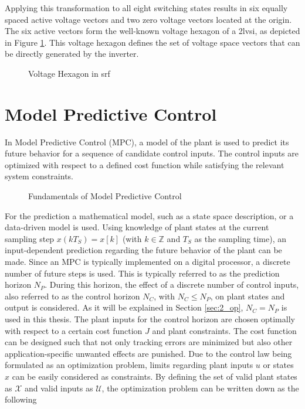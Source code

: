 Applying this transformation to all eight switching states results in six equally spaced active voltage vectors and two zero voltage vectors located at the origin. The six active vectors form the well-known voltage hexagon of a \acrshort{2lvsi}, as depicted in Figure \ref{fig:0_SRF_hexagon}. This voltage hexagon defines the set of voltage space vectors that can be directly generated by the inverter.
\begin{figure}[H]
	\centering
	
	\caption{Voltage Hexagon in \acrshort{srf}}
	\label{fig:0_SRF_hexagon}
\end{figure}

\section{Model Predictive Control} \label{sec:0_mpc}
In Model Predictive Control (MPC), a model of the plant is used to predict its future behavior for a sequence of candidate control inputs. The control inputs are optimized with respect to a defined cost function while satisfying the relevant system constraints. \\
\begin{figure}[h]
    \centering
    
    \caption{Fundamentals of Model Predictive Control}
    \label{fig:0_mpc_scheme}
\end{figure}
For the prediction a mathematical model, such as a state space description, or a data-driven model is used. Using knowledge of plant states at the current sampling step $x(kT_S) = x[k]$ (with $k\in\mathbb{Z}$ and $T_S$ as the sampling time), an input-dependent prediction regarding the future behavior of the plant can be made. Since an MPC is typically implemented on a digital processor, a discrete number of future steps is used. This is typically referred to as the prediction horizon $N_P$. During this horizon, the effect of a discrete number of control inputs, also referred to as the control horizon $N_C$, with $N_C \le N_P$, on plant states and output is considered. As it will be explained in Section \ref{sec:2_op}, $N_C = N_P$ is used in this thesis. The plant inputs for the control horizon are chosen optimally with respect to a certain cost function $J$ and plant constraints. The cost function can be designed such that not only tracking errors are minimized but also other application-specific unwanted effects are punished. Due to the control law being formulated as an optimization problem, limits regarding plant inputs $u$ or states $x$ can be easily considered as constraints. By defining the set of valid plant states as $\mathcal{X}$ and valid inputs as $\mathcal{U}$, the optimization problem can be written down as the following
